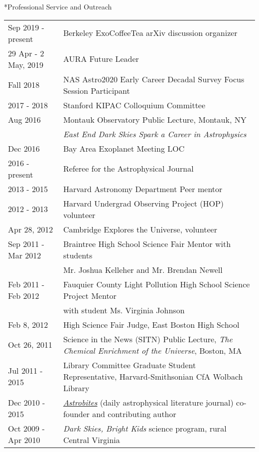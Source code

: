 \documentclass[10pt]{article}
\makeatletter
\renewcommand{\section}{\@startsection{section}{1}{0pt}{-\baselineskip}{0.5\baselineskip}{\scshape\color{myblue1}}}
\makeatother
\begin{document}
\section*{Professional Service and Outreach}
\begin{tabular*}{\textwidth}{@{\hspace{10pt}}p{1.4in}l}
Sep 2019 - present & Berkeley ExoCoffeeTea arXiv discussion organizer \\ 
29 Apr - 2 May, 2019 & AURA Future Leader \\
Fall 2018 & NAS Astro2020 Early Career Decadal Survey Focus Session Participant \\
2017 - 2018 & Stanford KIPAC Colloquium Committee \\
Aug 2016 & Montauk Observatory Public Lecture, Montauk, NY \\
&  \emph{East End Dark Skies Spark a Career in Astrophysics}\\
Dec 2016 & Bay Area Exoplanet Meeting LOC \\
2016 - present & Referee for the Astrophysical Journal \\
2013 - 2015 & Harvard Astronomy Department Peer mentor\\
2012 - 2013 & Harvard Undergrad Observing Project (HOP) volunteer\\
Apr 28, 2012 & Cambridge Explores the Universe, volunteer\\
Sep 2011 - Mar 2012 & Braintree High School Science Fair Mentor with students\\
& Mr. Joshua Kelleher and Mr. Brendan Newell\\
Feb 2011 - Feb 2012 & Fauquier County Light Pollution High School Science Project Mentor\\
& with student Ms. Virginia Johnson\\
Feb 8, 2012 & High Science Fair Judge, East Boston High School\\
Oct 26, 2011 & Science in the News (SITN) Public Lecture, \emph{The Chemical Enrichment of the Universe}, Boston, MA\\
Jul 2011 - 2015 & Library Committee Graduate Student Representative, Harvard-Smithsonian CfA Wolbach Library\\
Dec 2010 - 2015 & \href{http://astrobites.com/}{\emph{Astrobites}} (daily astrophysical literature journal) co-founder and contributing author\\
Oct 2009 - Apr 2010 & \emph{Dark Skies, Bright Kids} science program, rural Central Virginia\\
\end{tabular*}
\end{document}
